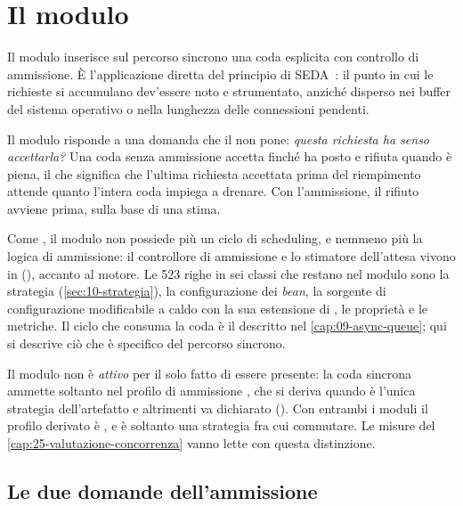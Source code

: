 \chapter{Il modulo }
\label{cap:10-sync-queue}

Il modulo  inserisce sul percorso sincrono una coda esplicita
con controllo di ammissione. \`E l'applicazione diretta del principio di
SEDA~\cite{welsh2001seda}: il punto in cui le richieste si accumulano dev'essere
noto e strumentato, anzich\'e disperso nei buffer del sistema operativo o nella
lunghezza delle connessioni pendenti.

Il modulo risponde a una domanda che il  non pone: \emph{questa
richiesta ha senso accettarla?} Una coda senza ammissione accetta finch\'e ha
posto e rifiuta quando \`e piena, il che significa che l'ultima richiesta
accettata prima del riempimento attende quanto l'intera coda impiega a
drenare. Con l'ammissione, il rifiuto avviene prima, sulla base di una stima.

Come , il modulo non possiede pi\`u un ciclo di scheduling, e
nemmeno pi\`u la logica di ammissione: il controllore di ammissione e lo
stimatore dell'attesa vivono in 
(), accanto al motore. Le 523 righe in sei classi che
restano nel modulo sono la strategia 
(\cref{sec:10-strategia}), la configurazione dei \emph{bean}, la sorgente di
configurazione modificabile a caldo con la sua estensione di
, le propriet\`a e le metriche. Il ciclo che consuma la coda
\`e il  descritto nel \cref{cap:09-async-queue}; qui si
descrive ci\`o che \`e specifico del percorso sincrono.

\begin{damisurare}
Il modulo non \`e \emph{attivo} per il solo fatto di essere presente: la coda
sincrona ammette soltanto nel profilo di ammissione , che si
deriva quando  \`e l'unica strategia dell'artefatto e
altrimenti va dichiarato (). Con entrambi i
moduli il profilo derivato \`e , e  \`e
soltanto una strategia fra cui commutare. Le misure del
\cref{cap:25-valutazione-concorrenza} vanno lette con questa distinzione.
\end{damisurare}

\section{Le due domande dell'ammissione}

